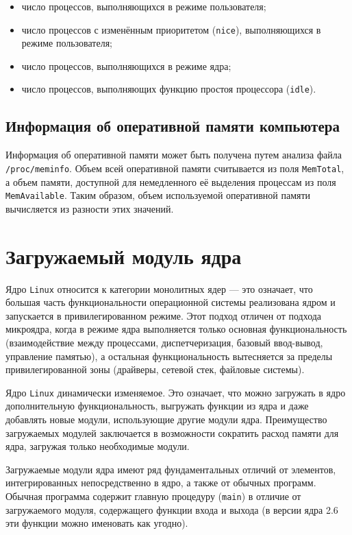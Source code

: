 \begin{itemize}
    \item число процессов, выполняющихся в режиме пользователя; 
    \item число процессов с изменённым приоритетом (\texttt{nice}), выполняющихся в режиме пользователя; 
    \item число процессов, выполняющихся в режиме ядра; 
    \item число процессов, выполняющих функцию простоя процессора (\texttt{idle}).
\end{itemize}


\subsection{Информация об оперативной памяти компьютера}

Информация об оперативной памяти может быть получена путем анализа файла \texttt{/proc/meminfo}. Объем всей оперативной памяти считывается из поля \texttt{MemTotal}, а объем памяти, доступной для немедленного её выделения процессам из поля \texttt{MemAvailable}. Таким образом, объем используемой оперативной памяти вычисляется из разности этих значений.


\section{Загружаемый модуль ядра}

Ядро \texttt{Linux} относится к категории монолитных ядер --- это означает, что большая часть функциональности операционной системы реализована ядром и запускается в привилегированном режиме. Этот подход отличен от подхода микроядра, когда в режиме ядра выполняется только основная функциональность (взаимодействие между процессами, диспетчеризация, базовый ввод-вывод, управление памятью), а остальная функциональность вытесняется за пределы привилегированной зоны (драйверы, сетевой стек, файловые системы).

Ядро \texttt{Linux} динамически изменяемое. Это означает, что можно загружать в ядро дополнительную функциональность, выгружать функции из ядра и даже добавлять новые модули, использующие другие модули ядра. Преимущество загружаемых модулей заключается в возможности сократить расход памяти для ядра, загружая только необходимые модули.

Загружаемые модули ядра имеют ряд фундаментальных отличий от элементов, интегрированных непосредственно в ядро, а также от обычных программ. Обычная программа содержит главную процедуру (\texttt{main}) в отличие от загружаемого модуля, содержащего функции входа и выхода (в версии ядра 2.6 эти функции можно именовать как угодно). 

